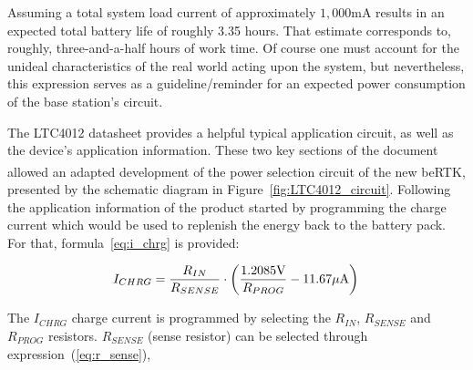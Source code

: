 \noindent Assuming a total system load current of approximately $1,000$mA results in an expected total battery life of roughly 3.35 hours. That estimate corresponds to, roughly, three-and-a-half hours of work time. Of course one must account for the unideal characteristics of the real world acting upon the system, but nevertheless, this expression serves as a guideline/reminder for an expected power consumption of the base station's circuit. 

The LTC4012 datasheet provides a helpful typical application circuit, as well as the device's application information. These two key sections of the document allowed an adapted development of the power selection circuit of the new beRTK\textsuperscript{\textregistered}, presented by the schematic diagram in Figure~\ref{fig:LTC4012_circuit}. Following the application information of the product started by programming the charge current which would be used to replenish the energy back to the battery pack. For that, formula~\ref{eq:i_chrg} is provided:

\begin{equation}\label{eq:i_chrg}
    I_{CHRG}=\frac{R_{IN}}{R_{SENSE}} \cdot \left(\frac{1.2085\textrm{V}}{R_{PROG}}-11.67\mu\textrm{A}\right)\,\medskip
\end{equation}

\noindent The $I_{CHRG}$ charge current is programmed by selecting the $R_{IN}$, $R_{SENSE}$ and $R_{PROG}$ resistors. $R_{SENSE}$ (sense resistor) can be selected through expression~(\ref{eq:r_sense}),

